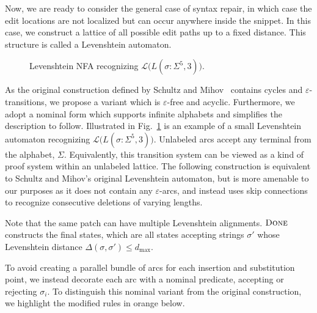 \documentclass[sigplan,review,acmsmall,nonacm,screen,anonymous]{acmart}\settopmatter{printfolios=false,printccs=false,printacmref=false}
\begin{document}
Now, we are ready to consider the general case of syntax repair, in which case the edit locations are not localized but can occur anywhere inside the snippet. In this case, we construct a lattice of all possible edit paths up to a fixed distance. This structure is called a Levenshtein automaton.

\begin{figure}
  \vspace{-0.3cm}
  \begin{center}
    
  \end{center}
  \caption{Levenshtein NFA recognizing $\mathcal{L}\big(L(\sigma: \Sigma^5, 3)\big)$.}\label{fig:lev_nfa}
  \vspace{-0.5cm}
\end{figure}

As the original construction defined by Schultz and Mihov~\cite{schulz2002fast} contains cycles and $\varepsilon$-transitions, we propose a variant which is $\varepsilon$-free and acyclic. Furthermore, we adopt a nominal form which supports infinite alphabets and simplifies the description to follow. Illustrated in Fig.~\ref{fig:lev_nfa} is an example of a small Levenshtein automaton recognizing $\mathcal{L}\big(L(\sigma: \Sigma^5, 3)\big)$. Unlabeled arcs accept any terminal from the alphabet, $\Sigma$. Equivalently, this transition system can be viewed as a kind of proof system within an unlabeled lattice. The following construction is equivalent to Schultz and Mihov's original Levenshtein automaton, but is more amenable to our purposes as it does not contain any $\varepsilon$-arcs, and instead uses skip connections to recognize consecutive deletions of varying lengths.



Note that the same patch can have multiple Levenshtein alignments. $\textsc{Done}$ constructs the final states, which are all states accepting strings $\sigma'$ whose Levenshtein distance $\Delta(\sigma, \sigma') \leq d_\max$.

To avoid creating a parallel bundle of arcs for each insertion and substitution point, we instead decorate each arc with a nominal predicate, accepting or rejecting $\sigma_i$. To distinguish this nominal variant from the original construction, we highlight the modified rules in orange below.
\end{document}
